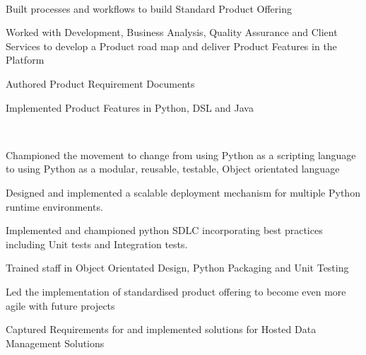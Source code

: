 \documentclass[letterpaper]{deedy-resume} %
\begin{document}
\begin{minipage}[t]{0.66\textwidth} %


\\
 
\begin{tightitemize}
	
	\item Built processes and workflows to build Standard Product Offering
	\item Worked with Development, Business Analysis, Quality Assurance and Client Services to develop a Product road map and deliver Product Features in the Platform
	\item Authored Product Requirement Documents
	\item Implemented Product Features in Python, DSL and Java
	
\end{tightitemize}

\sectionspace %


\\
 
\begin{tightitemize}
	
	\item Championed the movement to change from using Python as a scripting language to using Python as a modular, reusable, testable, Object orientated language
	\item Designed and implemented a scalable deployment mechanism for multiple Python runtime environments.
	\item Implemented and championed python SDLC incorporating best practices including Unit tests and Integration tests.
	\item  Trained staff in Object Orientated Design, Python Packaging and Unit Testing
	\item Led the implementation of standardised product offering to become even more agile with future
	projects
	\item Captured Requirements for and implemented solutions for Hosted Data Management Solutions
	

\end{tightitemize}
\end{minipage}
\end{document}
